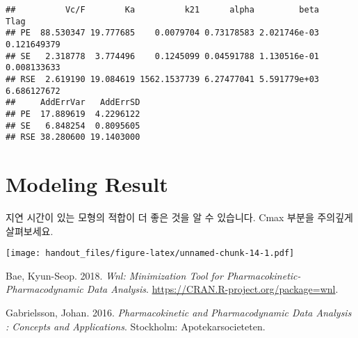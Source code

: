 \documentclass[
  9pt,
]{krantz}
\newenvironment{Shaded}{\begin{snugshade}}{\end{snugshade}}
\newcommand{\DataTypeTok}[1]{\textcolor[rgb]{0.13,0.29,0.53}{#1}}
\newcommand{\DecValTok}[1]{\textcolor[rgb]{0.00,0.00,0.81}{#1}}
\newcommand{\KeywordTok}[1]{\textcolor[rgb]{0.13,0.29,0.53}{\textbf{#1}}}
\newcommand{\NormalTok}[1]{#1}
\newcommand{\OperatorTok}[1]{\textcolor[rgb]{0.81,0.36,0.00}{\textbf{#1}}}
\newcommand{\StringTok}[1]{\textcolor[rgb]{0.31,0.60,0.02}{#1}}
\begin{document}
\begin{verbatim}
##          Vc/F        Ka          k21      alpha         beta        Tlag
## PE  88.530347 19.777685    0.0079704 0.73178583 2.021746e-03 0.121649379
## SE   2.318778  3.774496    0.1245099 0.04591788 1.130516e-01 0.008133633
## RSE  2.619190 19.084619 1562.1537739 6.27477041 5.591779e+03 6.686127672
##     AddErrVar   AddErrSD
## PE  17.889619  4.2296122
## SE   6.848254  0.8095605
## RSE 38.280600 19.1403000
\end{verbatim}

\hypertarget{modeling-result-2}{%
\section{Modeling Result}\label{modeling-result-2}}

지연 시간이 있는 모형의 적합이 더 좋은 것을 알 수 있습니다. Cmax 부분을 주의깊게 살펴보세요.

\begin{Shaded}
\end{Shaded}

\texttt{[image: handout\_files/figure-latex/unnamed-chunk-14-1.pdf]}

\hypertarget{refs}{}
\leavevmode\hypertarget{ref-R-wnl}{}%
Bae, Kyun-Seop. 2018. \emph{Wnl: Minimization Tool for Pharmacokinetic-Pharmacodynamic Data Analysis}. \url{https://CRAN.R-project.org/package=wnl}.

\leavevmode\hypertarget{ref-gab}{}%
Gabrielsson, Johan. 2016. \emph{Pharmacokinetic and Pharmacodynamic Data Analysis : Concepts and Applications}. Stockholm: Apotekarsocieteten.
\end{document}
